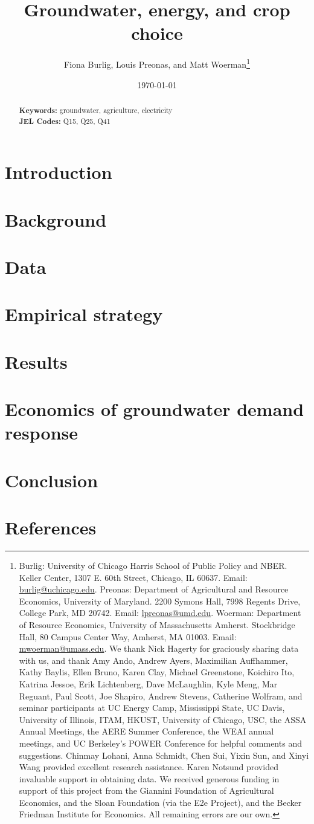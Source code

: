\documentclass[hidelinks,12pt]{article}
\title{\vspace{-10mm} {Groundwater, energy, and crop choice}
}
\date{\today\\ \vspace{0.3cm} %
}
\author{
Fiona Burlig, Louis Preonas, and Matt Woerman\thanks{\scriptsize Burlig: University of Chicago Harris School of Public Policy and NBER. Keller Center, 1307 E. 60th Street, Chicago, IL 60637. Email: \url{burlig@uchicago.edu}. Preonas: Department of Agricultural and Resource Economics, University of Maryland. 2200 Symons Hall, 7998 Regents Drive, College Park, MD 20742. Email: \url{lpreonas@umd.edu}. Woerman: Department of Resource Economics, University of Massachusetts Amherst. Stockbridge Hall, 80 Campus Center Way, Amherst, MA 01003. Email: \url{mwoerman@umass.edu}. 
%
We thank Nick Hagerty for graciously sharing data with us, and thank Amy Ando, Andrew Ayers, Maximilian Auffhammer, Kathy Baylis, Ellen Bruno, Karen Clay, Michael Greenstone, Koichiro Ito, Katrina Jessoe, Erik Lichtenberg, Dave McLaughlin, Kyle Meng, Mar Reguant, Paul Scott, Joe Shapiro, Andrew Stevens, Catherine Wolfram, and seminar participants at UC Energy Camp, Mississippi State, UC Davis, University of Illinois, ITAM, HKUST, University of Chicago, USC, the ASSA Annual Meetings, the AERE Summer Conference, the WEAI annual meetings, and UC Berkeley's POWER Conference for helpful comments and suggestions.
%
Chinmay Lohani, Anna Schmidt, Chen Sui, Yixin Sun, and Xinyi Wang provided excellent research assistance.
%
Karen Notsund provided invaluable support in obtaining data. 
%
We received generous funding in support of this project from the Giannini Foundation of Agricultural Economics, and the Sloan Foundation (via the E2e Project), and the Becker Friedman Institute for Economics.
%
All remaining errors are our own.}}
\begin{document}
\setlength{\parindent}{0.9cm}
\maketitle
\thispagestyle{empty}
\normalsize
\begin{abstract}


\noindent \textbf{Keywords:} groundwater, agriculture, electricity \\
\noindent \textbf{JEL Codes:} Q15, Q25, Q41 \\
 

\end{abstract}
\vspace{5mm}

\newpage
\clearpage
\setcounter{page}{1}
\begin{refsection}
\begin{spacing}{1.5} {

\section{Introduction}
\label{sec:intro}


\section{Background}
\label{sec:background}



\section{Data}
\label{sec:data}



\section{Empirical strategy}
\label{sec:empirics}



\section{Results}
\label{sec:results}



\section{Economics of groundwater demand response}
\label{sec:mechanisms}


\section{Conclusion}
\label{sec:conclusion}

}
\end{spacing}


\section*{References}
\printbibliography[heading=none]
\newpage
\end{refsection}
\FloatBarrier
\end{document}
